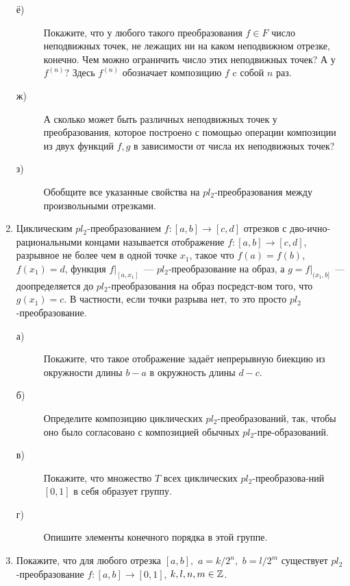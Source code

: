 \begin{enumerate}
\begin{description}
\item[ё)] Покажите, что у любого такого преобразования $f\in F$ число неподвижных точек, не лежащих ни на каком неподвижном отрезке, конечно. Чем можно ограничить число этих неподвижных точек? А у $f^{(n)}$?  Здесь $f^{(n)}$ обозначает композицию $f$ c собой $n$ раз.
\item[ж)] А сколько может быть различных неподвижных точек у преобразования, которое построено с помощью операции композиции из двух функций $f,g$ в зависимости от числа их неподвижных точек?
\item[з)] Обобщите все указанные свойства на $pl_2$-преобразования между произвольными отрезками.
\end{description}

\item Циклическим $pl_2$-преобразованием $f\colon[a,b]\to [c,d]$ отрезков с дво-\linebreak ично-рациональными концами называется отображение $f\colon[a,b]\to [c,d]$, разрывное не более чем в одной точке $x_1$, такое что $f(a)=f(b)$, $f(x_1)=d$, функция $f|_{[a,x_1]}$~— $pl_2$-преобразование на образ, а $g=f|_{(x_1,b]}$~— доопределяется до $pl_2$-преобразования на образ посредст-\linebreak вом того, что $g(x_1)=c$. В частности, если точки разрыва нет, то это просто $pl_2$-преобразование.
\begin{description}
\item[а)] Покажите, что такое отображение задаёт непрерывную биекцию из окружности длины $b-a$ в окружность длины $d-c$.
\item[б)] Определите композицию циклических $pl_2$-преобразований, так, чтобы оно было согласовано с композицией обычных $pl_2$-пре-\linebreak образований.
\item[в)] Покажите, что множество $T$ всех циклических $pl_2$-преобразова-\linebreak ний $[0,1]$ в себя образует группу.
\item[г)] Опишите элементы конечного порядка в этой группе.
\end{description}

\item Покажите, что для любого отрезка $[a,b], \,\, a=k/2^n,\,\, b=l/2^m$ существует $pl_2$-преобразование $f\colon [a,b]\to [0,1]$, $k, l, n, m \in\mathbb{Z}$.



\end{enumerate}
